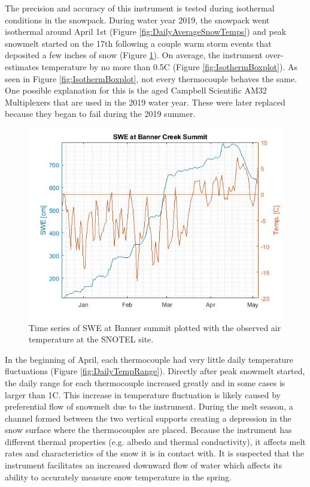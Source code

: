 The precision and accuracy of this instrument is tested during isothermal conditions in the snowpack. During water year 2019, the snowpack went isothermal around April 1st (Figure \ref{fig:DailyAverageSnowTemps}) and peak snowmelt started on the 17th following a couple warm storm events that deposited a few inches of snow (Figure \ref{fig:SWE_SNTLTemp}). On average, the instrument over-estimates temperature by no more than 0.5\textdegree C (Figure \ref{fig:IsothermBoxplot}). As seen in Figure \ref{fig:IsothermBoxplot}, not every thermocouple behaves the same. One possible explanation for this is the aged Campbell Scientific AM32 Multiplexers that are used in the 2019 water year. These were later replaced because they began to fail during the 2019 summer.  
 
\begin{figure}[H]
    \centering
    \includegraphics[width=0.7\linewidth]{figures/SWE_SNTLTemp.jpg}
    \caption{Time series of SWE at Banner summit plotted with the observed air temperature at the SNOTEL site.}
    \label{fig:SWE_SNTLTemp}
\end{figure}

In the beginning of April, each thermocouple had very little daily temperature fluctuations (Figure \ref{fig:DailyTempRange}). Directly after peak snowmelt started, the daily range for each thermocouple increased greatly and in some cases is larger than 1\textdegree C. This increase in temperature fluctuation is likely caused by preferential flow of snowmelt due to the instrument. During the melt season, a channel formed between the two vertical supports creating a depression in the snow surface where the thermocouples are placed. Because the instrument has different thermal properties (e.g. albedo and thermal conductivity), it affects melt rates and characteristics of the snow it is in contact with. It is suspected that the instrument facilitates an increased downward flow of water which affects its ability to accurately measure snow temperature in the spring. 

